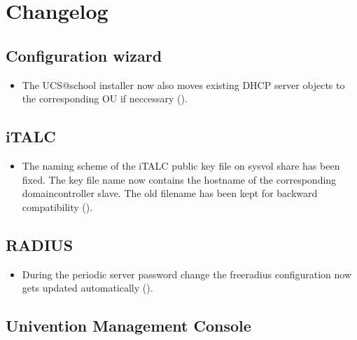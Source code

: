 \dominitoc
\tableofcontents
\newpage

\chapter{Changelog}
\newcommand{\ucsUCRV}[1]{Univention Configuration Registry variable \ucsCommand{\ucsBCindex{#1}}}
\newcommand{\ucsCVE}[1]{\href{http://security-tracker.debian.org/tracker/CVE-#1}{CVE-#1}}

\section{Configuration wizard}
\begin{itemize}
\item The UCS@school installer now also moves existing DHCP server objects to the corresponding OU if neccessary ().
\end{itemize}

\section{iTALC}
\begin{itemize}
\item The naming scheme of the iTALC public key file on sysvol share has been fixed. The key file name now
      contains the hostname of the corresponding domaincontroller slave. The old filename has been kept for
      backward compatibility ().
\end{itemize}

\section{RADIUS}
\begin{itemize}
\item During the periodic server password change the freeradius configuration now gets updated automatically ().
\end{itemize}


\section{Univention Management Console}
